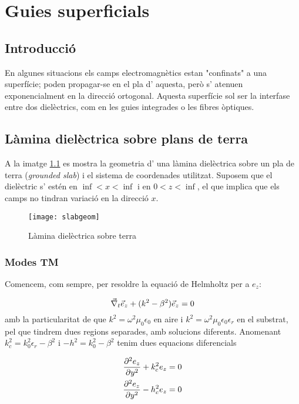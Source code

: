\chapter{Guies superficials}

\section{Introducció}

En algunes situacions els camps electromagnètics estan "confinats" a una superfície; poden propagar-se en el pla d' aquesta, però s' atenuen exponencialment en la direcció ortogonal. Aquesta superfície sol ser la interfase entre dos dielèctrics, com en les guies integrades o les fibres òptiques.

\section{Làmina dielèctrica sobre plans de terra}

A la imatge \ref{slab} es mostra la geometria d' una làmina dielèctrica sobre un pla de terra (\textit{grounded slab}) i el sistema de coordenades utilitzat. Suposem que el dielèctric s' estén en $\inf < x < \inf$ i en $0 < z < \inf$, el que implica que els camps no tindran variació en la direcció $x$.

\begin{figure}[ht]
  \centering
  \texttt{[image: slabgeom]}
  \caption{Làmina dielèctrica sobre terra}
  \label{slab}
\end{figure}

\subsection{Modes TM}

Comencem, com sempre, per resoldre la equació de Helmholtz per a $e_z$:

\begin{equation}
  \del _t \vec e_z + (k^2 - \beta ^2) \vec e_z = 0
\end{equation}
amb la particularitat de que $k^2 = \omega^2 \mu_0\epsilon _0$ en aire i $k^2 = \omega^2 \mu_0 \epsilon _0 \epsilon _r$ en el substrat, pel que tindrem dues regions separades, amb solucions diferents. Anomenant $k_c ^2 = k_0 ^2 \epsilon _r - \beta^2$ i $-h^2=k_0^2 - \beta^2$ tenim dues equacions diferencials

\begin{subequations}
  \begin{align}
    \pd[2]{e_z}{y} + k^2 _c e_z &= 0 \\
    \pd[2]{e_z}{y} - h^2 _c e_z &= 0
  \end{align}
\end{subequations}

